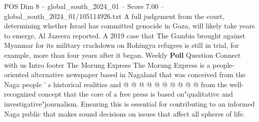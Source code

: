 \begin{textsample}{POS Dim 8 – global\_south\_2024\_01 – Score 7.00 – global\_south\_2024\_01/105114926.txt}
A full judgement from the court, determining whether Israel has committed genocide in Gaza, will likely take years to emerge, Al Jazeera reported.
A 2019 case that The Gambia brought against Myanmar for its military crackdown on Rohingya refugees is still in trial, for example, more than four years after it began.
Weekly \textbf{Poll} Question Connect with us Intro footer The Morung Express The Morung Express is a people-oriented alternative newspaper based in Nagaland that was conceived from the Naga people ' s historical realities and @ @ @ @ @ @ @ @ @ @ from the well-recognized concept that the core of a free press is based on"qualitative and investigative"journalism.
Ensuring this is essential for contributing to an informed Naga public that makes sound decisions on issues that affect all spheres of life.

\end{textsample}
